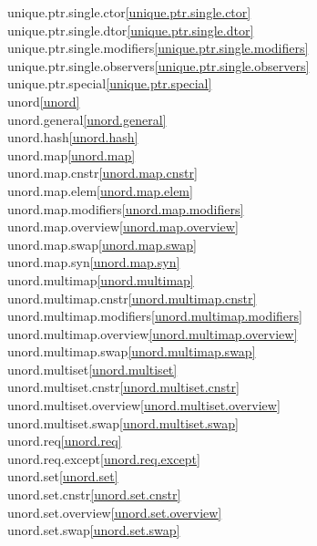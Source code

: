 \begin{multicols}{2}
unique.ptr.single.ctor\quad\ref{unique.ptr.single.ctor}\\
unique.ptr.single.dtor\quad\ref{unique.ptr.single.dtor}\\
unique.ptr.single.modifiers\quad\ref{unique.ptr.single.modifiers}\\
unique.ptr.single.observers\quad\ref{unique.ptr.single.observers}\\
unique.ptr.special\quad\ref{unique.ptr.special}\\
unord\quad\ref{unord}\\
unord.general\quad\ref{unord.general}\\
unord.hash\quad\ref{unord.hash}\\
unord.map\quad\ref{unord.map}\\
unord.map.cnstr\quad\ref{unord.map.cnstr}\\
unord.map.elem\quad\ref{unord.map.elem}\\
unord.map.modifiers\quad\ref{unord.map.modifiers}\\
unord.map.overview\quad\ref{unord.map.overview}\\
unord.map.swap\quad\ref{unord.map.swap}\\
unord.map.syn\quad\ref{unord.map.syn}\\
unord.multimap\quad\ref{unord.multimap}\\
unord.multimap.cnstr\quad\ref{unord.multimap.cnstr}\\
unord.multimap.modifiers\quad\ref{unord.multimap.modifiers}\\
unord.multimap.overview\quad\ref{unord.multimap.overview}\\
unord.multimap.swap\quad\ref{unord.multimap.swap}\\
unord.multiset\quad\ref{unord.multiset}\\
unord.multiset.cnstr\quad\ref{unord.multiset.cnstr}\\
unord.multiset.overview\quad\ref{unord.multiset.overview}\\
unord.multiset.swap\quad\ref{unord.multiset.swap}\\
unord.req\quad\ref{unord.req}\\
unord.req.except\quad\ref{unord.req.except}\\
unord.set\quad\ref{unord.set}\\
unord.set.cnstr\quad\ref{unord.set.cnstr}\\
unord.set.overview\quad\ref{unord.set.overview}\\
unord.set.swap\quad\ref{unord.set.swap}\\

\end{multicols}
